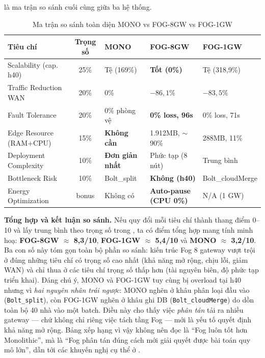 \documentclass[13pt,a4paper]{report}
\newcommand{\code}[1]{\texttt{\small #1}}
\begin{document}
 là ma trận so sánh cuối cùng giữa ba hệ thống.

\begin{table}[H]
\centering
\caption{Ma trận so sánh toàn diện MONO vs FOG-8GW vs FOG-1GW}
\label{tab:matrix}
\scriptsize
\renewcommand{\arraystretch}{1.25}
\begin{tabular}{p{} c p{} p{} p{}}
\toprule
\textbf{Tiêu chí} & \textbf{Trọng số} & \textbf{MONO} & \textbf{FOG-8GW} & \textbf{FOG-1GW} \\
\midrule
Scalability (cap. h40)   & 25\% & Tệ (169\%) & \textbf{Tốt (0\%)} & Tệ (318,9\%) \\
Traffic Reduction WAN    & 20\% & 0\% & $-86,1\%$ & $-83,5\%$ \\
Fault Tolerance          & 20\% & 0\% phòng vệ & \textbf{0\% loss, 96s} & 0\% loss, 71s \\
Edge Resource (RAM+CPU)  & 15\% & \textbf{Không cần} & 1.912MB, $\sim$90\% & 288MB, 11\% \\
Deployment Complexity    & 10\% & \textbf{Đơn giản nhất} & Phức tạp (8 nút) & Trung bình \\
Bottleneck Risk          & 10\% & Bolt\_split & \textbf{Không (h40)} & Bolt\_cloudMerge \\
Energy Optimization      & bonus& Không có & \textbf{Auto-pause (CPU 0\%)} & N/A (1 GW) \\
\bottomrule
\end{tabular}
\renewcommand{\arraystretch}{1.0}
\end{table}

\textbf{Tổng hợp và kết luận so sánh.} Nếu quy đổi mỗi tiêu chí thành thang điểm
0--10 và lấy trung bình theo trọng số trong , ta có điểm tổng hợp
mang tính minh hoạ: \textbf{FOG-8GW $\approx$ 8,3/10}, \textbf{FOG-1GW $\approx$
5,4/10} và \textbf{MONO $\approx$ 3,2/10}. Ba con số này tóm gọn toàn bộ phần so
sánh: kiến trúc Fog 8 gateway vượt trội ở đúng những tiêu chí có trọng số cao nhất
(khả năng mở rộng, chịu lỗi, giảm WAN) và chỉ thua ở các tiêu chí trọng số thấp
hơn (tài nguyên biên, độ phức tạp triển khai). Đáng chú ý, MONO và FOG-1GW tuy
cùng bị overload tại h40 nhưng vì \textit{hai nguyên nhân trái ngược}: MONO nghẽn
ở khâu phân loại đầu vào (\code{Bolt\_split}), còn FOG-1GW nghẽn ở khâu ghi DB
(\code{Bolt\_cloudMerge}) do dồn toàn bộ 40 nhà vào một batch. Điều này cho thấy
việc \textit{phân tán} tải ra nhiều gateway --- chứ không chỉ riêng việc tách tầng
Fog --- mới là yếu tố quyết định khả năng mở rộng. Bảng xếp hạng vì vậy không nên
đọc là ``Fog luôn tốt hơn Monolithic'', mà là ``Fog phân tán đúng cách mới giải
quyết được bài toán quy mô lớn'', dẫn tới các khuyến nghị cụ thể ở .
\end{document}
